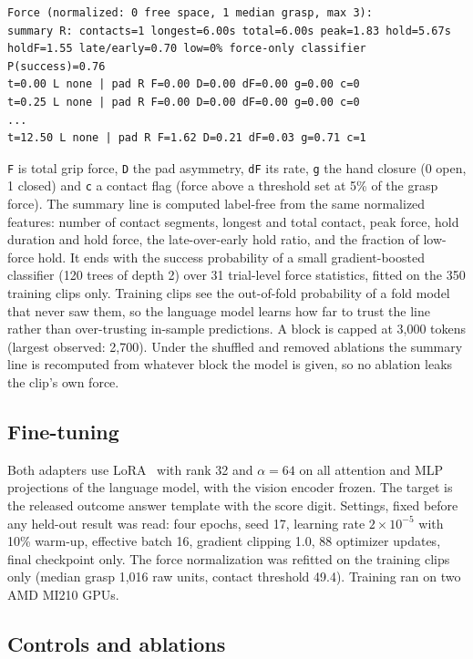 \documentclass{article}
\begin{document}
\begin{lstlisting}
Force (normalized: 0 free space, 1 median grasp, max 3):
summary R: contacts=1 longest=6.00s total=6.00s peak=1.83 hold=5.67s holdF=1.55 late/early=0.70 low=0% force-only classifier P(success)=0.76
t=0.00 L none | pad R F=0.00 D=0.00 dF=0.00 g=0.00 c=0
t=0.25 L none | pad R F=0.00 D=0.00 dF=0.00 g=0.00 c=0
...
t=12.50 L none | pad R F=1.62 D=0.21 dF=0.03 g=0.71 c=1
\end{lstlisting}

\texttt{F} is total grip force, \texttt{D} the pad asymmetry, \texttt{dF} its rate, \texttt{g}
the hand closure (0 open, 1 closed) and \texttt{c} a contact flag (force above a threshold set at
5\% of the grasp force). The summary line is computed label-free from the same normalized
features: number of contact segments, longest and total contact, peak force, hold duration and
hold force, the late-over-early hold ratio, and the fraction of low-force hold. It ends with the
success probability of a small gradient-boosted classifier (120 trees of depth 2) over 31
trial-level force statistics, fitted on the 350 training clips only. Training clips see the
out-of-fold probability of a fold model that never saw them, so the language model learns how far
to trust the line rather than over-trusting in-sample predictions. A block is capped at 3{,}000
tokens (largest observed: 2{,}700). Under the shuffled and removed ablations the summary line is
recomputed from whatever block the model is given, so no ablation leaks the clip's own force.

\subsection{Fine-tuning}

Both adapters use LoRA~\cite{hu2021lora} with rank 32 and $\alpha = 64$ on all attention and MLP
projections of the language model, with the vision encoder frozen. The target is the released
outcome answer template with the score digit. Settings, fixed before any held-out result was read:
four epochs, seed 17, learning rate $2 \times 10^{-5}$ with 10\% warm-up, effective batch 16,
gradient clipping 1.0, 88 optimizer updates, final checkpoint only. The force normalization
was refitted on the training clips only (median grasp 1{,}016 raw units, contact threshold 49.4).
Training ran on two AMD MI210 GPUs.

\subsection{Controls and ablations}
\end{document}
